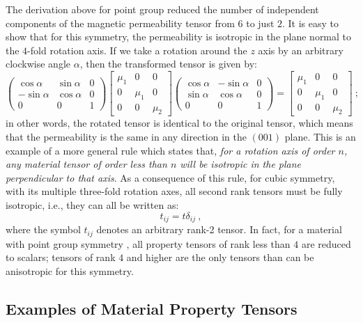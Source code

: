 The derivation above for point group  reduced the number of independent components of the magnetic permeability tensor from $6$ to just $2$.  It is easy to show that for this symmetry, the permeability is isotropic in the plane normal to the $4$-fold rotation axis. If we take a rotation around the $z$ axis by an arbitrary clockwise angle $\alpha$, then the transformed tensor is given by:
\[
	\begin{pmatrix}\cos\alpha &\sin\alpha&0\\ -\sin\alpha&\cos\alpha&0\\ 0&0&1\end{pmatrix}
	\begin{bmatrix}	\mu_{1} & 0 & 0 \\ 
	0 &  \mu_{1} & 0 \\ 
	0 & 0 & \mu_{2}\end{bmatrix}\begin{pmatrix}\cos\alpha &-\sin\alpha&0\\ \sin\alpha&\cos\alpha&0\\ 0&0&1\end{pmatrix}=
	\begin{bmatrix}	\mu_{1} & 0 & 0 \\ 
	0 &  \mu_{1} & 0 \\ 
	0 & 0 & \mu_{2}\end{bmatrix}\ ;
\]
in other words, the rotated tensor is identical to the original tensor, which means that the permeability is the same in any direction in the $(001)$ plane.  This is an example of a more general rule which states that, \textit{for a rotation axis of order $n$, any material tensor of order less than $n$ will be isotropic in the plane perpendicular to that axis}.  As a consequence of this rule, for cubic symmetry, with its multiple three-fold rotation axes, all second rank tensors must be fully isotropic, i.e., they can all be written as:
\[
	t_{ij} = t\delta_{ij}\ ,
\]
where the symbol $t_{ij}$ denotes an arbitrary rank-2 tensor.  In fact, for a material with point group symmetry , all property tensors of rank less than $4$ are reduced to scalars; tensors of rank $4$ and higher are the only tensors than can be anisotropic for this symmetry.


\subsection{Examples of Material Property Tensors}\label{\chabbr:sec:propertylist}
 
